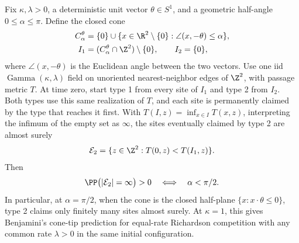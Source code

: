 \begin{corollary}
\label{cor:gamma-cone-tip}
Fix $\kappa,\lambda>0$, a deterministic unit vector $\theta\in S^1$,
and a geometric half-angle $0\le\alpha\le\pi$. Define the closed cone
\[
 \begin{aligned}
 C^\theta_\alpha&=\{0\}\cup
 \{x\in\R^2\setminus\{0\}:\angle(x,-\theta)\le\alpha\},\\
 I_1&=(C^\theta_\alpha\cap\Z^2)\setminus\{0\},
 \qquad I_2=\{0\},
 \end{aligned}
\]
where $\angle(x,-\theta)$ is the Euclidean angle between the two vectors.
Use one iid $\operatorname{Gamma}(\kappa,\lambda)$ field on unoriented
nearest-neighbor edges of $\Z^2$, with passage metric $T$. At time zero,
start type 1 from every site of $I_1$ and type 2 from $I_2$.
Both types use this same realization of $T$, and each site is permanently
claimed by the type that reaches it first. With
$T(I,z)=\inf_{x\in I}T(x,z)$, interpreting the infimum of the empty set
as $\infty$, the sites eventually claimed by type 2 are almost surely
\[
 \mathcal E_2=\{z\in\Z^2:T(0,z)<T(I_1,z)\}.
\]
Then
\[
 \PP\bigl(|\mathcal E_2|=\infty\bigr)>0
 \quad\Longleftrightarrow\quad
 \alpha<\pi/2.
\]
In particular, at $\alpha=\pi/2$, when the cone is the closed half-plane
$\{x:x\cdot\theta\le0\}$, type 2 claims only finitely many sites almost
surely. At $\kappa=1$, this gives Benjamini's cone-tip prediction for
equal-rate Richardson competition with any common rate $\lambda>0$ in
the same initial configuration.
\end{corollary}

